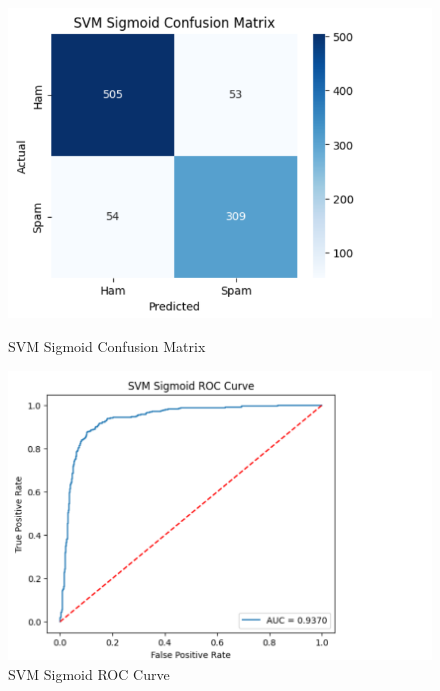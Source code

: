 \documentclass[12pt]{article}
\begin{document}
\begin{figure}[H]
\centering
\begin{minipage}{0.45\textwidth}
\centering
\includegraphics[width=\linewidth]{26.png}
\caption{SVM Sigmoid Confusion Matrix}
\end{minipage}
\hfill
\begin{minipage}{0.45\textwidth}
\centering
\includegraphics[width=\linewidth]{27.png}
\caption{SVM Sigmoid ROC Curve}
\end{minipage}
\end{figure}
\end{document}
